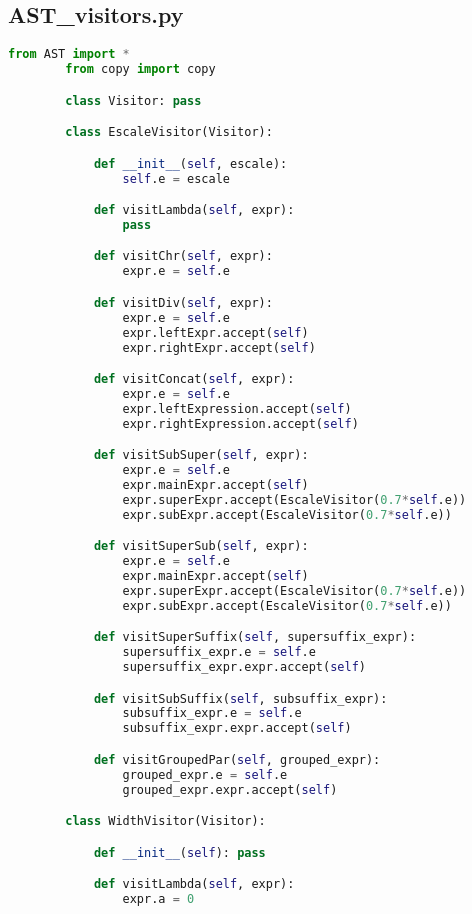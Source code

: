 \subsection{AST\_visitors.py}

    \begin{lstlisting}[language=Python]
        from AST import *
        from copy import copy

        class Visitor: pass

        class EscaleVisitor(Visitor):

            def __init__(self, escale):
                self.e = escale

            def visitLambda(self, expr):
                pass

            def visitChr(self, expr):
                expr.e = self.e

            def visitDiv(self, expr):
                expr.e = self.e
                expr.leftExpr.accept(self)
                expr.rightExpr.accept(self)

            def visitConcat(self, expr):
                expr.e = self.e
                expr.leftExpression.accept(self)
                expr.rightExpression.accept(self)

            def visitSubSuper(self, expr):
                expr.e = self.e
                expr.mainExpr.accept(self)
                expr.superExpr.accept(EscaleVisitor(0.7*self.e))
                expr.subExpr.accept(EscaleVisitor(0.7*self.e))

            def visitSuperSub(self, expr):
                expr.e = self.e
                expr.mainExpr.accept(self)
                expr.superExpr.accept(EscaleVisitor(0.7*self.e))
                expr.subExpr.accept(EscaleVisitor(0.7*self.e))

            def visitSuperSuffix(self, supersuffix_expr):
                supersuffix_expr.e = self.e
                supersuffix_expr.expr.accept(self)

            def visitSubSuffix(self, subsuffix_expr):
                subsuffix_expr.e = self.e
                subsuffix_expr.expr.accept(self)

            def visitGroupedPar(self, grouped_expr):
                grouped_expr.e = self.e
                grouped_expr.expr.accept(self)

        class WidthVisitor(Visitor):

            def __init__(self): pass

            def visitLambda(self, expr):
                expr.a = 0


\end{lstlisting}
